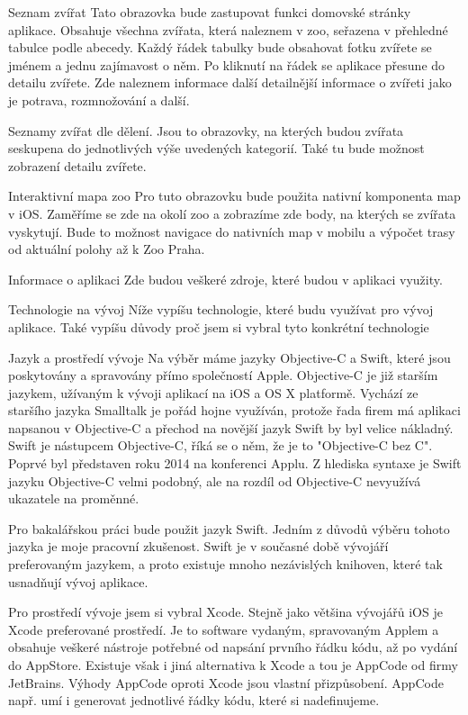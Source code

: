 \documentclass[thesis=B,czech]{FITthesis}[2012/06/26]
\begin{document}
Seznam zvířat
Tato obrazovka bude zastupovat funkci domovské stránky aplikace. Obsahuje všechna zvířata, která naleznem v zoo, seřazena v přehledné tabulce podle abecedy. Každý řádek tabulky bude obsahovat fotku zvířete se jménem a jednu zajímavost o něm. Po kliknutí na řádek se aplikace přesune do detailu zvířete. Zde naleznem informace další detailnější informace o zvířeti jako je potrava, rozmnožování a další.

Seznamy zvířat dle dělení.
Jsou to obrazovky, na kterých budou zvířata seskupena do jednotlivých výše uvedených kategorií. Také tu bude možnost zobrazení detailu zvířete.

Interaktivní mapa zoo
Pro tuto obrazovku bude použita nativní komponenta map v iOS. Zaměříme se zde na okolí zoo a zobrazíme zde body, na kterých se zvířata vyskytují. Bude to možnost navigace do nativních map v mobilu a výpočet trasy od aktuální polohy až k Zoo Praha. 

Informace o aplikaci
Zde budou veškeré zdroje, které budou v aplikaci využity.

Technologie na vývoj
Níže vypíšu technologie, které budu využívat pro vývoj aplikace. Také vypíšu důvody proč jsem si vybral tyto konkrétní technologie

Jazyk a prostředí vývoje
Na výběr máme jazyky Objective-C a Swift, které jsou poskytovány a spravovány přímo společností Apple. Objective-C je již starším jazykem, užívaným k vývoji aplikací na iOS a OS X platformě. Vychází ze staršího jazyka Smalltalk je pořád hojne využíván, protože řada firem má aplikaci napsanou v Objective-C a přechod na novější jazyk Swift by byl velice nákladný.
Swift je nástupcem Objective-C, říká se o něm, že je to "Objective-C bez C". Poprvé byl představen roku 2014 na konferenci Applu. Z hlediska syntaxe je Swift jazyku Objective-C velmi podobný, ale na rozdíl od Objective-C nevyužívá ukazatele na proměnné.

Pro bakalářskou práci bude použit jazyk Swift. Jedním z důvodů výběru tohoto jazyka je moje pracovní zkušenost. Swift je v současné době vývojáří preferovaným jazykem, a proto existuje mnoho nezávislých knihoven, které tak usnadňují vývoj aplikace.

Pro prostředí vývoje jsem si vybral Xcode. Stejně jako většina vývojářů iOS je Xcode preferované prostředí. Je to software vydaným, spravovaným Applem a obsahuje veškeré nástroje potřebné od napsání prvního řádku kódu, až po vydání do AppStore. Existuje však i jiná alternativa k Xcode a tou je AppCode od firmy JetBrains. Výhody AppCode oproti Xcode jsou vlastní přizpůsobení. AppCode např. umí i generovat jednotlivé řádky kódu, které si nadefinujeme.
\end{document}
